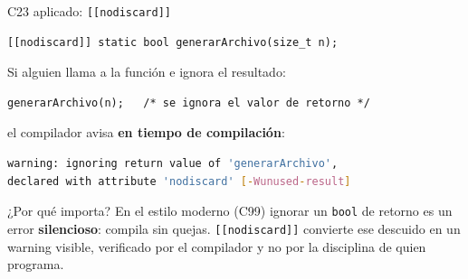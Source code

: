 \documentclass[aspectratio=169]{beamer}
\begin{document}
\begin{frame}[fragile]{C23 aplicado: \texttt{[[nodiscard]]}}
    \begin{lstlisting}
[[nodiscard]] static bool generarArchivo(size_t n);
    \end{lstlisting}

    \vspace{0.3em}
    Si alguien llama a la función e ignora el resultado:
    \begin{lstlisting}
generarArchivo(n);   /* se ignora el valor de retorno */
    \end{lstlisting}

    \vspace{0.3em}
    el compilador avisa \textbf{en tiempo de compilación}:
    \begin{lstlisting}[language=bash]
warning: ignoring return value of 'generarArchivo',
declared with attribute 'nodiscard' [-Wunused-result]
    \end{lstlisting}

    \begin{alertblock}{¿Por qué importa?}
        En el estilo moderno (C99) ignorar un \texttt{bool} de retorno es un
        error \textbf{silencioso}: compila sin quejas. \texttt{[[nodiscard]]}
        convierte ese descuido en un warning visible, verificado por el
        compilador y no por la disciplina de quien programa.
    \end{alertblock}
\end{frame}
\end{document}
